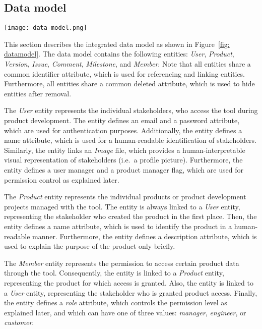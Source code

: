\subsection{Data model}
\label{sec:contribution:data}

\begin{figure*}[ht]
    \centering
    \texttt{[image: data-model.png]}
    \caption{Integrated data model for improved information exchange between customers, project managers, requirements engineers, and product designers}
    \label{fig: datamodel}
\end{figure*}

This section describes the integrated data model as shown in Figure~\ref{fig: datamodel}.
The data model contains the following entities: \textit{User}, \textit{Product}, \textit{Version}, \textit{Issue}, \textit{Comment}, \textit{Milestone}, and \textit{Member}.
Note that all entities share a common identifier attribute, which is used for referencing and linking entities.
Furthermore, all entities share a common deleted attribute, which is used to hide entities after removal.

The \textit{User} entity represents the individual stakeholders, who access the tool during product development.
The entity defines an email and a password attribute, which are used for authentication purposes.
Additionally, the entity defines a name attribute, which is used for a human-readable identification of stakeholders.
Similarly, the entity links an \textit{Image} file, which provides a human-interpretable visual representation of stakeholders (i.e.\ a profile picture).
Furthermore, the entity defines a user manager and a product manager flag, which are used for permission control as explained later.

The \textit{Product} entity represents the individual products or product development projects managed with the tool.
The entity is always linked to a \textit{User} entity, representing the stakeholder who created the product in the first place.
Then, the entity defines a name attribute, which is used to identify the product in a human-readable manner.
Furthermore, the entity defines a description attribute, which is used to explain the purpose of the product only briefly.

The \textit{Member} entity represents the permission to access certain product data through the tool.
Consequently, the entity is linked to a \textit{Product} entity, representing the product for which access is granted.
Also, the entity is linked to a \textit{User} entity, representing the stakeholder who is granted product access.
Finally, the entity defines a \textit{role} attribute, which controls the permission level as explained later, and which can have one of three values: \textit{manager}, \textit{engineer}, or \textit{customer}.

